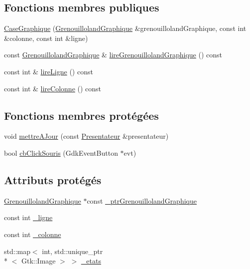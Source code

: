 \subsection*{Fonctions membres publiques}
\begin{DoxyCompactItemize}
\item 
\hyperlink{classgrenouilloland_1_1CaseGraphique_a05e456185c11de9239e27bff41c2d53e}{Case\-Graphique} (\hyperlink{classgrenouilloland_1_1GrenouillolandGraphique}{Grenouilloland\-Graphique} \&grenouilloland\-Graphique, const int \&colonne, const int \&ligne)
\item 
const \hyperlink{classgrenouilloland_1_1GrenouillolandGraphique}{Grenouilloland\-Graphique} \& \hyperlink{classgrenouilloland_1_1CaseGraphique_a10c9a3768da212d67598deda0609d98f}{lire\-Grenouilloland\-Graphique} () const 
\item 
const int \& \hyperlink{classgrenouilloland_1_1CaseGraphique_a0533ed9960cdd84cdc064888cc27d952}{lire\-Ligne} () const 
\item 
const int \& \hyperlink{classgrenouilloland_1_1CaseGraphique_a8f575954b15de168325c0869c66d6a87}{lire\-Colonne} () const 
\end{DoxyCompactItemize}
\subsection*{Fonctions membres protégées}
\begin{DoxyCompactItemize}
\item 
void \hyperlink{classgrenouilloland_1_1CaseGraphique_a08a0e069b5572708c69beb22edc6da65}{mettre\-A\-Jour} (const \hyperlink{classgrenouilloland_1_1Presentateur}{Presentateur} \&presentateur)
\item 
bool \hyperlink{classgrenouilloland_1_1CaseGraphique_ab6f2daebfafae5076c4390ecbed5cbe1}{cb\-Click\-Souris} (Gdk\-Event\-Button $\ast$evt)
\end{DoxyCompactItemize}
\subsection*{Attributs protégés}
\begin{DoxyCompactItemize}
\item 
\hyperlink{classgrenouilloland_1_1GrenouillolandGraphique}{Grenouilloland\-Graphique} $\ast$const \hyperlink{classgrenouilloland_1_1CaseGraphique_a0ef536735e07c4f90f32afa4b74928d3}{\-\_\-ptr\-Grenouilloland\-Graphique}
\item 
const int \hyperlink{classgrenouilloland_1_1CaseGraphique_a66f59a2fcbc16ffda0bd1e30471737f3}{\-\_\-ligne}
\item 
const int \hyperlink{classgrenouilloland_1_1CaseGraphique_ae4e49cd04cefb12a3b42e2e57678520a}{\-\_\-colonne}
\item 
std\-::map$<$ int, std\-::unique\-\_\-ptr\\*
$<$ Gtk\-::\-Image $>$ $>$ \hyperlink{classgrenouilloland_1_1CaseGraphique_a020fe5a8b0c1e7d803c50ba268ec83d7}{\-\_\-etats}
\end{DoxyCompactItemize}
